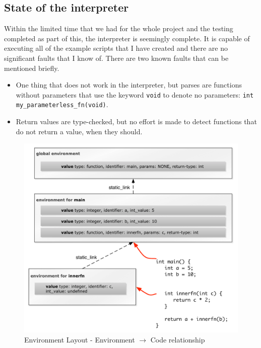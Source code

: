 \subsection{State of the interpreter}
Within the limited time that we had for the whole project and the testing completed as part of this, the interpreter is seemingly complete. It is capable of executing all of the example scripts that I have created and there are no significant faults that I know of. There are two known faults that can be mentioned briefly.
\begin{itemize}
	\item One thing that does not work in the interpreter, but parses are functions without parameters that use the keyword \verb!void! to denote no parameters: \verb!int my_parameterless_fn(void)!.
	\item Return values are type-checked, but no effort is made to detect functions that do not return a value, when they should.
\end{itemize}

\begin{figure}[p]
	\includegraphics[scale=0.7]{environments-include.pdf}
	\caption{Environment Layout - Environment $\rightarrow$ Code relationship}
	\label{fig:environment}	
\end{figure}

